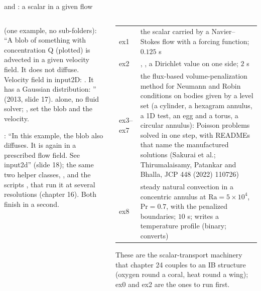 \documentclass[aspectratio=169,11pt]{beamer}
\begin{document}
\begin{frame}{ and : a scalar in a given flow}
\label{fr:adv}
\begin{columns}[T,onlytextwidth]
\begin{column}{0.46\textwidth}
\footnotesize {} (one example, no sub-folders): ``A blob of something with concentration Q (plotted) is advected in a given velocity field. It does not diffuse. Velocity field in input2D: . It has a Gaussian distribution: '' (2013, slide 17).  alone, no fluid solver; ,  set the blob and the velocity.
\vspace{1mm}

\footnotesize {}: ``In this example, the blob also diffuses. It is again in a prescribed flow field. See input2d'' (slide 18); the same two helper classes, , and the scripts ,  that run it at several resolutions (chapter 16). Both finish in a second.
\end{column}
\begin{column}{0.52\textwidth}
\scriptsize
\setlength{\tabcolsep}{3pt}
\begin{tabular}{@{}lL{0.8\textwidth}@{}}
\toprule
ex1 & the scalar carried by a Navier--Stokes flow with a forcing function; $0.125$ s\\
ex2 & , , a Dirichlet value  on one side; $2$ s\\
ex3--ex7 & the flux-based volume-penalization method for Neumann and Robin conditions on bodies given by a level set (a cylinder, a hexagram annulus, a 1D test, an egg and a torus, a circular annulus): Poisson problems solved in one step, with READMEs that name the manufactured solutions (Sakurai et al.; Thirumalaisamy, Patankar and Bhalla, JCP 448 (2022) 110726)\\
ex8 & steady natural convection in a concentric annulus at $\mathrm{Ra} = 5\times10^4$, $\mathrm{Pr} = 0.7$, with the penalized boundaries; $10$ s; writes a temperature profile (binary;  converts)\\
\bottomrule
\end{tabular}
\vspace{1mm}

\scriptsize These are the scalar-transport machinery that chapter 24 couples to an IB structure (oxygen round a coral, heat round a wing); ex0 and ex2 are the ones to run first.
\end{column}
\end{columns}
\end{frame}
\end{document}
